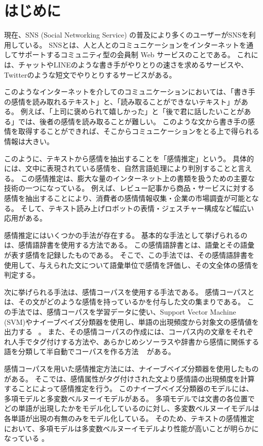 \documentclass[11pt,a4j]{jsarticle}
\begin{document}
 \pagestyle{plain}
 \setcounter{page}{1}
 
 
\section{はじめに}\label{sec:begin}
現在、SNS (Social Networking Service) の普及により多くのユーザーがSNSを利用している。
SNSとは、人と人とのコミュニケーションをインターネットを通してサポートするコミュニティ型の会員制 Web サービスのことである。
これには、チャットやLINE\raisebox{.5zw}{\scalebox{.5}{\textregistered}}のような書き手がやりとりの速さを求めるサービスや、Twitter\raisebox{.5zw}{\scalebox{.5}{\textregistered}}のような短文でやりとりするサービスがある。

このようなインターネットを介してのコミュニケーションにおいては、「書き手の感情を読み取れるテキスト」と、「読み取ることができないテキスト」がある。
例えば、「上司に褒められて嬉しかった」と「後で君に話したいことがある」では、後者の感情を読み取ることが難しい。
このような文から書き手の感情を取得することができれば、そこからコミュニケーションをとる上で得られる情報は大きい。

このように、テキストから感情を抽出することを「感情推定」という。
具体的には、文中に表現されている感情を、自然言語処理により判別することと言える。
この感情推定は、膨大な量のインターネット上の書類を扱うための主要な技術の一つになっている。
例えば、レビュー記事から商品・サービスに対する感情を抽出することにより、消費者の感情情報収集・企業の市場調査が可能となる。
そして、テキスト読み上げロボットの表情・ジェスチャー構成など幅広い応用がある。

感情推定にはいくつかの手法が存在する。
基本的な手法として挙げられるのは、感情語辞書を使用する方法である。
この感情語辞書とは、語彙とその語彙が表す感情を記録したものである。
そこで、この手法では、その感情語辞書を使用して、与えられた文について語彙単位で感情を評価し、その文全体の感情を判定する。

次に挙げられる手法は、感情コーパスを使用する手法である。
感情コーパスとは、その文がどのような感情を持っているかを付与した文の集まりである。
この手法では、感情コーパスを学習データに使い、Support Vector Machine (SVM)やナイーブベイズ分類器を使用し、単語の出現頻度から対象文の感情値を出力する ~。
また、その感情コーパスの作成には、コーパス内の文章をそれぞれ人手でタグ付けする方法や、あらかじめシソーラスや辞書から感情に関係する語を分類して半自動でコーパスを作る方法 ~ がある。

感情コーパスを用いた感情推定方法には、ナイーブベイズ分類器を使用したものがある。
そこでは、感情属性がタグ付けされた文より感情語の出現頻度を計算することによって感情推定を行う。
このナイーブベイズ分類器のモデルには、多項モデルと多変数ベルヌーイモデルがある。
多項モデルでは文書の各位置でどの単語が出現したかをモデル化しているのに対し、多変数ベルヌーイモデルは各単語が出現の有無のみをモデル化している。
そのため、テキストの感情推定において、多項モデルは多変数ベルヌーイモデルより性能が高いことが明らかになっている 。
\end{document}
